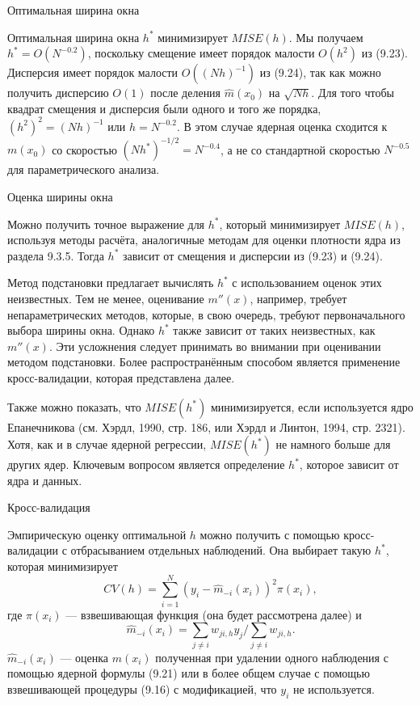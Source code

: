 \begin{center}
Оптимальная ширина окна
\end{center}

Оптимальная ширина окна $h^*$ минимизирует $MISE(h)$. Мы получаем $h^* = O(N^{-0.2})$, поскольку смещение имеет порядок малости $O(h^2)$ из (9.23). Дисперсия имеет порядок малости $O((Nh)^{-1})$ из (9.24), так как можно получить дисперсию $O(1)$ после деления $\hat{m}(x_0)$ на $\sqrt{Nh}$. Для того чтобы квадрат смещения и дисперсия были одного и того же порядка, $(h^2)^2 = (Nh)^{-1}$ или $h = N^{-0.2}$. В этом случае ядерная оценка сходится к $m(x_0)$ со скоростью $(Nh^*)^{-1/2} = N^{-0.4}$, а не со стандартной скоростью $N^{-0.5}$ для параметрического анализа.

\begin{center}
Оценка ширины окна
\end{center}

Можно получить точное выражение для $h^*$, который минимизирует $MISE(h)$, используя методы расчёта, аналогичные методам для оценки плотности ядра из раздела 9.3.5. Тогда $h^*$ зависит от смещения и дисперсии из (9.23) и (9.24).

Метод подстановки предлагает вычислять $h^*$ с использованием оценок этих неизвестных. Тем не менее, оценивание $m''(x)$, например, требует непараметрических методов, которые, в свою очередь, требуют первоначального выбора ширины окна. Однако $h^*$ также зависит от таких неизвестных, как $m''(x)$. Эти усложнения следует принимать во внимании при оценивании методом подстановки. Более распространённым способом является применение кросс-валидации, которая представлена далее.

Также можно показать, что $MISE(h^*)$ минимизируется, если используется ядро Епанечникова (см. Хэрдл, 1990, стр. 186, или Хэрдл и Линтон, 1994, стр. 2321). Хотя, как и в случае ядерной регрессии, $MISE(h^*)$ не намного больше для других ядер. Ключевым вопросом является определение $h^*$, которое зависит от ядра и данных.

\begin{center}
Кросс-валидация
\end{center}

Эмпирическую оценку оптимальной $h$ можно получить с помощью  кросс-валидации с отбрасыванием отдельных наблюдений. Она выбирает такую $h^*$, которая минимизирует
\begin{equation}
CV(h) = \sum_{i=1}^N (y_i - \hat{m}_{-i}(x_i))^2\pi(x_i),
\end{equation}
где $\pi(x_i)$ --- взвешивающая функция (она будет рассмотрена далее) и 
\begin{equation}
\hat{m}_{-i}(x_i) = \sum_{j \not= i} w_{ji,h} y_j/\sum_{j \not= i} w_{ji,h}.
\end{equation}
$\hat{m}_{-i}(x_i)$ --- оценка $m(x_i)$ полученная при удалении одного наблюдения с помощью ядерной формулы (9.21) или в более общем случае с помощью взвешивающей процедуры (9.16) с модификацией, что $y_i$ не используется.

